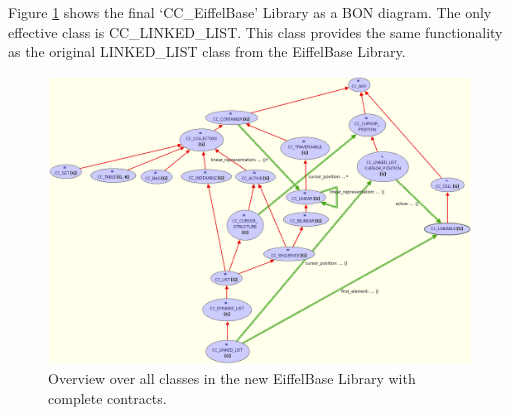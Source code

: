 Figure \ref{fig:CC_EiffelBase} shows the final `CC\_EiffelBase' Library as a BON diagram. The only effective class is CC\_LINKED\_LIST. This class provides the same functionality as the original LINKED\_LIST class from the EiffelBase Library.

\begin{figure}
	\centering
	\includegraphics[width=1.00\textwidth]{pictures/CC_EiffelBase.png}
	\caption{Overview over all classes in the new EiffelBase Library with complete contracts.}
	\label{fig:CC_EiffelBase}
\end{figure}

